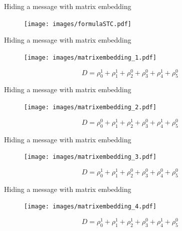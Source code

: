 \documentclass[10pt]{beamer}
\begin{document}
\begin{frame}{Hiding a message with matrix embedding}
\begin{figure}[h]
\texttt{[image: images/formulaSTC.pdf]}
\end{figure}
\end{frame}


\begin{frame}{Hiding a message with matrix embedding}
\begin{figure}[h]
\texttt{[image: images/matrixembedding\_1.pdf]}
\end{figure}
\begin{equation}
    D = \rho_0^1 +  \rho_1^1 + \rho_2^0 +  \rho_3^0 + \rho_4^1 +  \rho_5^0
\end{equation}
\end{frame}



\begin{frame}{Hiding a message with matrix embedding}
\begin{figure}[h]
\texttt{[image: images/matrixembedding\_2.pdf]}
\end{figure}
\begin{equation}
    D = \rho_0^0 +  \rho_1^1 + \rho_2^1 +  \rho_3^0 + \rho_4^1 +  \rho_5^0
\end{equation}
\end{frame}

\begin{frame}{Hiding a message with matrix embedding}
\begin{figure}[h]
\texttt{[image: images/matrixembedding\_3.pdf]}
\end{figure}
\begin{equation}
    D = \rho_0^1 +  \rho_1^1 + \rho_2^0 +  \rho_3^0 + \rho_4^0 +  \rho_5^0
\end{equation}
\end{frame}

\begin{frame}{Hiding a message with matrix embedding}
\begin{figure}[h]
\texttt{[image: images/matrixembedding\_4.pdf]}
\end{figure}
\begin{equation}
    D = \rho_0^1 +  \rho_1^1 + \rho_2^1 +  \rho_3^0 + \rho_4^1 +  \rho_5^0
\end{equation}
\end{frame}


\end{document}

